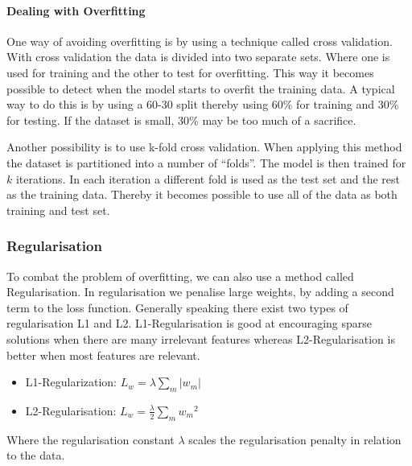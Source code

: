 \paragraph{Dealing with Overfitting}

One way of avoiding overfitting is by using a technique called cross validation.
With cross validation the data is divided into two separate sets.
Where one is used for training and the other to test for overfitting. 
This way it becomes possible to detect when the model starts to overfit the training data.
A typical way to do this is by using a 60-30 split thereby using 60\% for training and 30\% for testing.
If the dataset is small, 30\% may be too much of a sacrifice.

Another possibility is to use k-fold cross validation.
When applying this method the dataset is partitioned into a number of ``folds''.
The model is then trained for $k$ iterations.
In each iteration a different fold is used as the test set and the rest as the training data.
Thereby it becomes possible to use all of the data as both training and test set.
\begin{flushright}
\cite[p. 324]{AI2010}
\end{flushright}

\subsubsection{Regularisation}

To combat the problem of overfitting, we can also use a method called Regularisation.
In regularisation we penalise large weights, by adding a second term to the loss function.
Generally speaking there exist two types of regularisation L1 and L2.
L1-Regularisation is good at encouraging sparse solutions when there are many irrelevant features whereas L2-Regularisation is better when most features are relevant.

\begin{itemize}
\item L1-Regularization: $L_w = \lambda \sum_{m} \vert w_m \vert $ \\
\item L2-Regularisation: $L_w = \frac{\lambda}{2} \sum_{m} {w_m}^2$
\end{itemize}

Where the regularisation constant $\lambda$ scales the regularisation penalty in relation to the data. 

